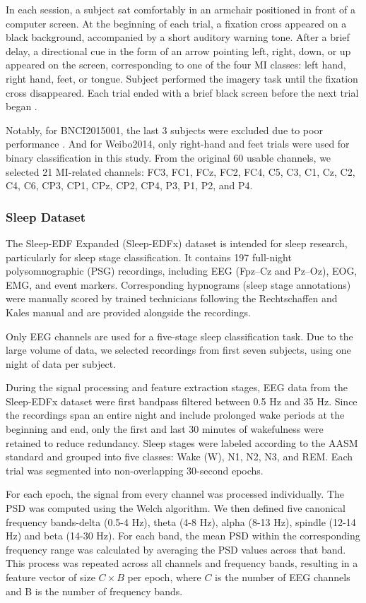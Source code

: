 \documentclass[journal,twocolumn]{IEEEtran}
\begin{document}
In each session, a subject sat comfortably in an armchair positioned in front of a computer screen. At the beginning of each trial, a fixation cross appeared on a black background, accompanied by a short auditory warning tone. After a brief delay, a directional cue in the form of an arrow pointing left, right, down, or up appeared on the screen, corresponding to one of the four MI classes: left hand, right hand, feet, or tongue. Subject performed the imagery task until the fixation cross disappeared. Each trial ended with a brief black screen before the next trial began \cite{tangermann2012review}.

Notably, for BNCI2015001, the last 3 subjects were excluded due to poor performance \cite{faller2012autocalibration}. And for Weibo2014, only right-hand and feet trials were used for binary classification in this study. From the original 60 usable channels, we selected 21 MI-related channels: FC3, FC1, FCz, FC2, FC4, C5, C3, C1, Cz, C2, C4, C6, CP3, CP1, CPz, CP2, CP4, P3, P1, P2, and P4.


\subsubsection{Sleep Dataset}
The Sleep-EDF Expanded (Sleep-EDFx) dataset is intended for sleep research, particularly for sleep stage classification. It contains 197 full-night polysomnographic (PSG) recordings, including EEG (Fpz–Cz and Pz–Oz), EOG, EMG, and event markers. Corresponding hypnograms (sleep stage annotations) were manually scored by trained technicians following the Rechtschaffen and Kales manual and are provided alongside the recordings.

Only EEG channels are used for a five-stage sleep classification task. Due to the large volume of data, we selected recordings from first seven subjects, using one night of data per subject.

During the signal processing and feature extraction stages, EEG data from the Sleep-EDFx dataset were first bandpass filtered between 0.5 Hz and 35 Hz. Since the recordings span an entire night and include prolonged wake periods at the beginning and end, only the first and last 30 minutes of wakefulness were retained to reduce redundancy. Sleep stages were labeled according to the AASM standard and grouped into five classes: Wake (W), N1, N2, N3, and REM. Each trial was segmented into non-overlapping 30-second epochs.

For each epoch, the signal from every channel was processed individually. The PSD was computed using the Welch algorithm. We then defined five canonical frequency bands-delta (0.5-4 Hz), theta (4-8 Hz), alpha (8-13 Hz), spindle (12-14 Hz) and beta (14-30 Hz). For each band, the mean PSD within the corresponding frequency range was calculated by averaging the PSD values across that band. This process was repeated across all channels and frequency bands, resulting in a feature vector of size $C \times B$ per epoch, where $C$ is the number of EEG channels and B is the number of frequency bands.
\end{document}
